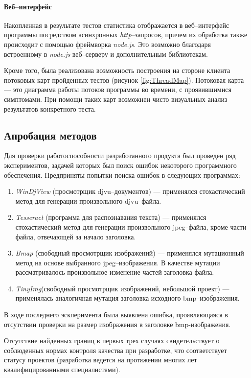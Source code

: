 \documentclass[a4paper,14pt,href]{article}
\begin{document}
\paragraph{Веб--интерфейс} Накопленная в результате тестов статистика отображается в веб--интерфейс программы посредством асинхронных \textit{http}--запросов, причем их обработка также происходит с помощью фреймворка \textit{node.js}. Это возможно благодаря встроенному в \textit{node.js} веб--серверу и дополнительным библиотекам\cite{expressjs}.

	Кроме того, была реализована возможность построения на стороне клиента потоковых карт пройденных тестов (рисунок \ref{fig:ThreadMap}). Потоковая карта --- это диаграмма работы потоков программы во времени, с проявившимися симптомами. При помощи таких карт возможнен чисто визуальных анализ результатов конкретного теста.

\subsection{Апробация методов}
  Для проверки работоспособности разработанного продукта был проведен ряд экспериментов, задачей которых был поиск ошибок некоторого программного обеспечения. Предприняты попытки поиска ошибок в следующих программах:\begin{enumerate}
\item \textit{WinDjView}\cite{WinDjView} (просмотрщик djvu--документов) --- применялся стохастический метод для генерации произвольного djvu--файла.
\item \textit{Tesseract}\cite{Tesseract} (программа для распознавания текста) --- применялся стохастический метод для генерации произвольного jpeg--файла, кроме части файла, отвечающей за начало заголовка.
\item \textit{Bmap}\cite{Bmap} (свободный просмотрщик изображений) --- применялся мутационный метод на основе выбранного jpeg--изображения. В качестве мутации рассматривалось произвольное изменение частей заголовка файла.
\item \textit{TinyImg}\cite{TinyImg}(свободный просмотрщик изображений, небольшой проект) --- применялась аналогичная мутация заголовка исходного bmp--изоб\-ра\-жения.
\end{enumerate}

	В ходе последнего эскперимента была выявлена ошибка, проявляющаяся в отсутствии проверки на размер изображения в заголовке bmp-изображения.

	Отсутствие найденных границ в первых трех случаях свидетельствует о соблюденных нормах контроля качества при разработке, что соответствует статусу проектов (разработка ведется на протяжении многих лет квалифицированными специалистами).
\newpage
\end{document}
